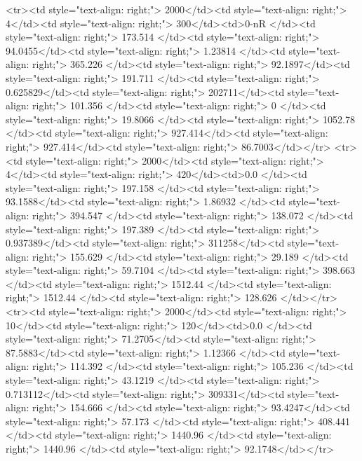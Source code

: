 <tr><td style="text-align: right;">      2000</td><td style="text-align: right;">         4</td><td style="text-align: right;">           300</td><td>0-nR         </td><td style="text-align: right;">               173.514 </td><td style="text-align: right;">            94.0455</td><td style="text-align: right;">         1.23814 </td><td style="text-align: right;">        365.226 </td><td style="text-align: right;">            92.1897</td><td style="text-align: right;">             191.711   </td><td style="text-align: right;">             0.625829</td><td style="text-align: right;">              202711</td><td style="text-align: right;">                      101.356 </td><td style="text-align: right;">             0     </td><td style="text-align: right;">                19.8066 </td><td style="text-align: right;">      1052.78  </td><td style="text-align: right;">    927.414</td><td style="text-align: right;">       927.414</td><td style="text-align: right;">                 86.7003</td></tr>
<tr><td style="text-align: right;">      2000</td><td style="text-align: right;">         4</td><td style="text-align: right;">           420</td><td>0.0          </td><td style="text-align: right;">               197.158 </td><td style="text-align: right;">            93.1588</td><td style="text-align: right;">         1.86932 </td><td style="text-align: right;">        394.547 </td><td style="text-align: right;">           138.072 </td><td style="text-align: right;">             197.389   </td><td style="text-align: right;">             0.937389</td><td style="text-align: right;">              311258</td><td style="text-align: right;">                      155.629 </td><td style="text-align: right;">            29.189 </td><td style="text-align: right;">                59.7104 </td><td style="text-align: right;">       398.663 </td><td style="text-align: right;">   1512.44 </td><td style="text-align: right;">      1512.44 </td><td style="text-align: right;">                128.626 </td></tr>
<tr><td style="text-align: right;">      2000</td><td style="text-align: right;">        10</td><td style="text-align: right;">           120</td><td>0.0          </td><td style="text-align: right;">                71.2705</td><td style="text-align: right;">            87.5883</td><td style="text-align: right;">         1.12366 </td><td style="text-align: right;">        114.392 </td><td style="text-align: right;">           105.236 </td><td style="text-align: right;">              43.1219  </td><td style="text-align: right;">             0.713112</td><td style="text-align: right;">              309331</td><td style="text-align: right;">                      154.666 </td><td style="text-align: right;">            93.4247</td><td style="text-align: right;">                57.173  </td><td style="text-align: right;">       408.441 </td><td style="text-align: right;">   1440.96 </td><td style="text-align: right;">      1440.96 </td><td style="text-align: right;">                 92.1748</td></tr>
